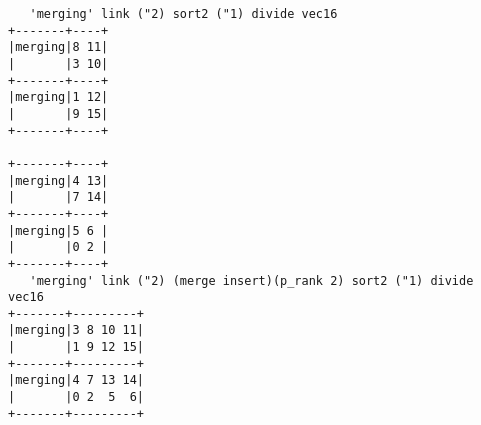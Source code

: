 \begin{singlespacing}
\begin{small}
\begin{verbatim}
   'merging' link ("2) sort2 ("1) divide vec16
+-------+----+
|merging|8 11|
|       |3 10|
+-------+----+
|merging|1 12|
|       |9 15|
+-------+----+

+-------+----+
|merging|4 13|
|       |7 14|
+-------+----+
|merging|5 6 |
|       |0 2 |
+-------+----+
   'merging' link ("2) (merge insert)(p_rank 2) sort2 ("1) divide vec16 
+-------+---------+
|merging|3 8 10 11|
|       |1 9 12 15|
+-------+---------+
|merging|4 7 13 14|
|       |0 2  5  6|
+-------+---------+
\end{verbatim}
\end{small}
\end{singlespacing}
